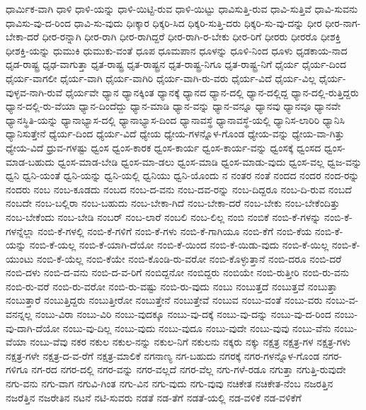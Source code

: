 {ಧಾರ್ಮಿಕ-ವಾಗಿ
ಧಾಳಿ
ಧಾಳಿ-ಯನ್ನು
ಧಾಳಿ-ಯಿಟ್ಟಿ-ರುವ
ಧಾಳಿ-ಯಿಟ್ಟು
ಧಾವಿಸುತ್ತಿ-ರುವ
ಧಾವಿ-ಸುತ್ತಿವೆ
ಧಾವಿ-ಸುವನು
ಧಾವಿಸು-ವು-ದ-ರಿಂದ
ಧಾವಿ-ಸು-ವುದು
ಧಿಃಕ್ಕಾರ
ಧಿಕ್ಕರಿ-ಸಿದ
ಧಿಕ್ಕರಿ-ಸುತ್ತಿ-ದರು
ಧಿಕ್ಕರಿ-ಸು-ವು-ದನ್ನು
ಧೀರ
ಧೀರ-ನಾಗ-ಬೇಕಾ-ದರೆ
ಧೀರ-ರನ್ನಾಗಿ
ಧೀರ-ರಾಗಿ
ಧೀರ-ರಾಗಿದ್ದರೆ
ಧೀರ-ರಾಗಿ-ರ-ಬೇಕು
ಧೀರ-ರಿಗೆ
ಧೀರರು
ಧೀರರೊ
ಧೀಶಕ್ತಿ
ಧೀಶಕ್ತಿ-ಯನ್ನು
ಧುಮುಕಿ
ಧುಮುಕು-ವಂತೆ
ಧೂಪ
ಧೂಮಪಾನ
ಧೂಳನ್ನು
ಧೂಳಿ-ನಿಂದ
ಧೂಳು
ಧೃಡಕಾಯ-ನಾದ
ಧೃಡ-ರಾಷ್ಟ್ರ
ಧೃಢ-ವಾಗುತ್ತಾ
ಧೃತ-ರಾಷ್ಟ್ರ
ಧೃತ-ರಾಷ್ಟ್ರನ
ಧೃತ-ರಾಷ್ಟ್ರ-ನಿಗೂ
ಧೃತ-ರಾಷ್ಟ್ರ-ನಿಗೆ
ಧೈರ್ಯ
ಧೈರ್ಯ-ದಿಂದ
ಧೈರ್ಯ-ವಾಗಲೀ
ಧೈರ್ಯ-ವಾಗಿ
ಧೈರ್ಯ-ವಾಗಿರಿ
ಧೈರ್ಯ-ವಾಗಿ-ರು-ವರು
ಧೈರ್ಯ-ವಿದೆ
ಧೈರ್ಯ-ವಿಲ್ಲ
ಧೈರ್ಯ-ವುಳ್ಳವ-ನಾಗಿ-ರುವೆ
ಧೈರ್ಯವೇ
ಧ್ಯಾನ
ಧ್ಯಾನಕ್ಕಿಂತ
ಧ್ಯಾನಕ್ಕೆ
ಧ್ಯಾನದ
ಧ್ಯಾನ-ದಲ್ಲಿ
ಧ್ಯಾನ-ದಲ್ಲಿದ್ದ
ಧ್ಯಾನ-ದಲ್ಲಿ-ರುತ್ತಿದ್ದರು
ಧ್ಯಾನ-ದಲ್ಲಿ-ರು-ವೆಯಾ
ಧ್ಯಾನ-ದಿಂದೆದ್ದು
ಧ್ಯಾನ-ಮಾಡಿ
ಧ್ಯಾನ-ವನ್ನು
ಧ್ಯಾನ-ವನ್ನೂ
ಧ್ಯಾನವು
ಧ್ಯಾನವೂ
ಧ್ಯಾನವೇ
ಧ್ಯಾನಸ್ಥಿತಿ-ಯನ್ನು
ಧ್ಯಾನಾಭ್ಯಾಸ-ದಲ್ಲಿ
ಧ್ಯಾನಾಭ್ಯಾಸ-ದಿಂದ
ಧ್ಯಾನಾವಸ್ಥೆ
ಧ್ಯಾನಾವಸ್ಥೆ-ಯಲ್ಲಿ
ಧ್ಯಾನಿಸ-ಲಾರಿರಿ
ಧ್ಯಾನಿಸಿ
ಧ್ಯಾನಿಸುತ್ತೇನೆ
ಧ್ಯೆರ್ಯ-ದಿಂದ
ಧ್ಯೆರ್ಯ-ವಿದೆ
ಧ್ಯೇಯ
ಧ್ಯೇಯ-ಗಳನ್ನೊಳ-ಗೊಂಡ
ಧ್ಯೇಯ-ವನ್ನು
ಧ್ಯೇಯ-ವಾ-ಗಿತ್ತು
ಧ್ಯೇಯ-ವಿದೆ
ಧ್ರುವ-ಗಳಷ್ಟು
ಧ್ವಂಸ
ಧ್ವಂಸ-ಕಾರಕ
ಧ್ವಂಸ-ಕಾರ್ಯ
ಧ್ವಂಸ-ಕಾರ್ಯ-ವನ್ನು
ಧ್ವಂಸಕ್ಕೆ
ಧ್ವಂಸದ
ಧ್ವಂಸ-ಮಾಡ-ಬಹುದು
ಧ್ವಂಸ-ಮಾಡ-ಬೇಡಿ
ಧ್ವಂಸ-ಮಾ-ಡಲು
ಧ್ವಂಸ-ಮಾಡಿ
ಧ್ವಂಸ-ಮಾಡು-ವುದು
ಧ್ವಂಸ-ವಲ್ಲ
ಧ್ವಜ-ವನ್ನು
ಧ್ವನಿ
ಧ್ವನಿ-ಯಂತೆ
ಧ್ವನಿ-ಯನ್ನು
ಧ್ವನಿ-ಯಲ್ಲಿ
ಧ್ವನಿಯು
ಧ್ವನಿ-ಯೊಂದು
ನ
ನಂತರ
ನಂತೆ
ನಂದದ
ನಂದರ
ನಂದ-ರನ್ನು
ನಂದರು
ನಂಬ
ನಂಬ-ಕೂಡದು
ನಂಬದ
ನಂಬ-ದ-ವನು
ನಂಬ-ದವ-ರನ್ನು
ನಂಬ-ದಿದ್ದರೂ
ನಂಬ-ದಿ-ರುವ
ನಂಬದೆ
ನಂಬದೇ
ನಂಬ-ಬಲ್ಲಿರಾ
ನಂಬ-ಬಹುದು
ನಂಬ-ಬೇಕಾ-ಗಿದೆ
ನಂಬ-ಬೇಕಾ-ದರೆ
ನಂಬ-ಬೇಕು
ನಂಬ-ಬೇಕೆಂದಿತ್ತು
ನಂಬ-ಬೇಕೆಂದು
ನಂಬ-ಬೇಡಿ
ನಂಬರ್
ನಂಬ-ಲಾರೆ
ನಂಬಲಿ
ನಂಬ-ಲಿಲ್ಲ
ನಂಬಿ
ನಂಬಿಕೆ
ನಂಬಿ-ಕೆ-ಗಳನ್ನು
ನಂಬಿ-ಕೆ-ಗಳನ್ನೆಲ್ಲಾ
ನಂಬಿ-ಕೆ-ಗಳಲ್ಲಿ
ನಂಬಿ-ಕೆ-ಗಳಿಗೆ
ನಂಬಿ-ಕೆ-ಗಳು
ನಂಬಿ-ಕೆ-ಗಾಗಿಯೂ
ನಂಬಿ-ಕೆಗೆ
ನಂಬಿ-ಕೆಯ
ನಂಬಿ-ಕೆ-ಯನ್ನು
ನಂಬಿ-ಕೆ-ಯಲ್ಲ
ನಂಬಿ-ಕೆ-ಯಾಗಿ-ದೆಯೋ
ನಂಬಿ-ಕೆ-ಯಿಂದ
ನಂಬಿ-ಕೆ-ಯಿಡು-ವುದು
ನಂಬಿ-ಕೆ-ಯಿಲ್ಲ
ನಂಬಿ-ಕೆ-ಯುಂಟು
ನಂಬಿ-ಕೆ-ಯೆಲ್ಲ
ನಂಬಿ-ಕೆಯೇ
ನಂಬಿ-ಕೊಂಡಿ-ರು-ವರೋ
ನಂಬಿ-ಕೊಳ್ಳುತ್ತಾನೆ
ನಂಬಿ-ದರೂ
ನಂಬಿ-ದರೆ
ನಂಬಿ-ದಳು
ನಂಬಿ-ದ-ವನು
ನಂಬಿ-ದ-ವ-ರಿಗೆ
ನಂಬಿದ್ದನೋ
ನಂಬಿದ್ದರು
ನಂಬಿಯೇ
ನಂಬಿ-ರುತ್ತೀರಿ
ನಂಬಿ-ರು-ವನು
ನಂಬಿ-ರು-ವರೆ
ನಂಬಿ-ರು-ವರೋ
ನಂಬಿ-ರು-ವಷ್ಟು
ನಂಬಿ-ರು-ವುದು
ನಂಬು
ನಂಬುತ್ತದೆ
ನಂಬುತ್ತವೆ
ನಂಬುತ್ತಾ
ನಂಬುತ್ತಾರೆ
ನಂಬುತ್ತಿದ್ದರು
ನಂಬುತ್ತೀರೋ
ನಂಬುತ್ತೇನೆ
ನಂಬುತ್ತೇವೆ
ನಂಬುವ
ನಂಬು-ವಂತೆ
ನಂಬು-ವರು
ನಂಬು-ವ-ವನನ್ನಲ್ಲ
ನಂಬು-ವಿರಾ
ನಂಬು-ವಿರಿ
ನಂಬು-ವುದಕ್ಕೂ
ನಂಬು-ವು-ದಕ್ಕೆ
ನಂಬು-ವು-ದನ್ನು
ನಂಬು-ವು-ದ-ರಿಂದ
ನಂಬು-ವು-ದಾಗಿ-ದೆಯೋ
ನಂಬು-ವು-ದಿಲ್ಲ
ನಂಬು-ವುದು
ನಂಬು-ವುದೂ
ನಂಬು-ವುದೇ
ನಂಬು-ವುವು
ನಂಬು-ವೆನು
ನಂಬು-ವೆಯಾ
ನಂಬು-ವೆವು
ನಕರ
ನಕುಲ
ನಕುಲ-ನನ್ನು
ನಕುಲ-ನಿಗೆ
ನಕುಲನು
ನಕ್ಕರು
ನಕ್ಕು
ನಕ್ಷತ್ರ
ನಕ್ಷತ್ರ-ಗಳ
ನಕ್ಷತ್ರ-ಗಳು
ನಕ್ಷತ್ರ-ಗಳೇ
ನಕ್ಷತ್ರ-ದ-ವ-ರೆಗೆ
ನಕ್ಷತ್ರ-ಮಾಲಿಕೆ
ನಗನಾಣ್ಯ
ನಗ-ಬಹುದು
ನಗರಕ್ಕೆ
ನಗರ-ಗಳನ್ನೊಳ-ಗೊಂಡ
ನಗರ-ಗಳಿಗೂ
ನಗ-ರದ
ನಗರ-ದಲ್ಲಿ
ನಗರ-ವನ್ನು
ನಗರ-ವಲ್ಲದೆ
ನಗರ-ವೆಲ್ಲ
ನಗು-ಗಳೆ-ರಡೂ
ನಗುತ್ತಾ
ನಗುತ್ತಿ-ರುವುದೇ
ನಗು-ವನು
ನಗು-ವಾಗ
ನಗುವಿ-ಗಿಂತ
ನಗು-ವಿನ
ನಗು-ವುದು
ನಗು-ವುವು
ನಚಿಕೇತ
ನಚಿಕೇತ-ನೆಂಬ
ನಜರತ್ತಿನ
ನಜರೆತ್ತಿನ
ನಜರೇತಿನ
ನಟನೆ
ನಟಿ-ಸುವರು
ನಡತೆ
ನಡ-ತೆಗೆ
ನಡತೆ-ಯಲ್ಲಿ
ನಡ-ವಳಿಕೆ
ನಡ-ವಳಿಕೆಗೆ
}
